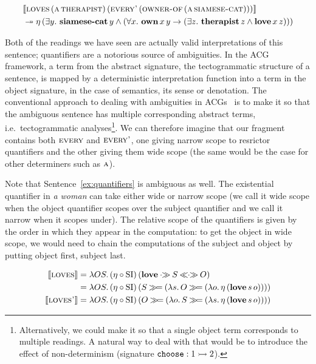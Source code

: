 \addtocounter{equation}{-1}
\NoChapterPrefix
\begin{align}
& \llbracket \textsc{loves}\,(\textsc{a}\,\textsc{therapist})\,(\textsc{every'}\,(\textsc{owner-of}\,(\textsc{a}\,\textsc{siamese-cat}))) \rrbracket \nonumber \\
&\twoheadrightarrow \eta\,(\exists y.\ \textbf{siamese-cat}\,y \land (\forall x.\ \textbf{own}\,x\,y \to (\exists z.\ \textbf{therapist}\,z \land \textbf{love}\,x\,z)))
\end{align}
\ChapterPrefix

Both of the readings we have seen are actually valid interpretations of
this sentence; quantifiers are a notorious source of ambiguities. In the
ACG framework, a term from the abstract signature, the tectogrammatic
structure of a sentence, is mapped by a deterministic interpretation
function into a term in the object signature, in the case of semantics, its
sense or denotation. The conventional approach to dealing with ambiguities
in ACGs~\cite{de2001towards,pogodalla2007generalizing} is to make it so
that the ambiguous sentence has multiple corresponding abstract terms,
i.e.\ tectogrammatic analyses\footnote{Alternatively, we could make it so
  that a single object term corresponds to multiple readings. A natural way
  to deal with that would be to introduce the effect of non-determinism
  (signature $\mathtt{choose} : 1 \rightarrowtail 2$).
}. We can therefore imagine that our fragment contains both $\textsc{every}$
and $\textsc{every'}$, one giving narrow scope to resrictor quantifiers and
the other giving them wide scope (the same would be the case for other
determiners such as $\textsc{a}$).

Note that Sentence~\ref{ex:quantifiers} is ambiguous as well. The
existential quantifier in \emph{a woman} can take either wide or narrow
scope (we call it wide scope when the object quantifier scopes over the
subject quantifier and we call it narrow when it scopes under). The
relative scope of the quantifiers is given by the order in which they
appear in the computation: to get the object in wide scope, we would need
to chain the computations of the subject and object by putting object
first, subject last.

\begin{align*}
\lex{loves}{\lam{O S}{\ap{(\eta \circ \SI)}{(\obj{love} \apr S \aplr O)}}} \\
&= \lam{O S}{\ap{(\eta \circ \SI)}{(S \hsbind (\lam{s}{O \hsbind
  (\lam{o}{\etaE{(\app{\obj{love}}{s}{o})}})}))}} \\
\lex{loves'}{\lam{O S}{\ap{(\eta \circ \SI)}{(O \hsbind (\lam{o}{S \hsbind
  (\lam{s}{\etaE{(\app{\obj{love}}{s}{o})}})}))}}}
\end{align*}

